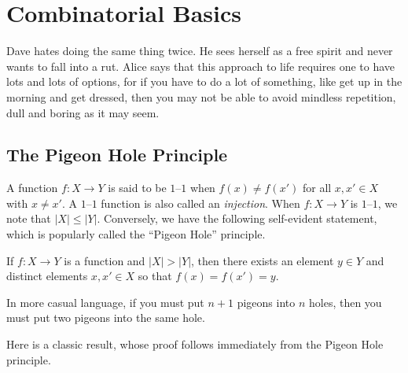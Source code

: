 
\chapter{Combinatorial Basics}\label{ch:basics}

Dave hates doing the same thing twice.  He sees herself
as a free spirit and never wants to fall into a rut.  Alice
says that this approach to life requires one to have lots
and lots of options, for if you have to do a lot of something,
like get up in the morning and get dressed, then you may not
be able to avoid mindless repetition, dull and boring as it
may seem.

\section{The Pigeon Hole Principle}\label{s:basics:pigeonhole}

A function $f:X\longrightarrow Y$ is said to be $1$--$1$ when
$f(x)\neq f(x')$ for all $x,x'\in X$ with $x\neq x'$.  A $1$--$1$
function is also called an \textit{injection}.  When
$f:X\longrightarrow Y$ is $1$--$1$, we note that $|X|\le |Y|$.
Conversely, we have the following self-evident statement, which is
popularly called the ``Pigeon Hole'' principle.

\begin{proposition}\label{prop:pigeon}
If $f:X\longrightarrow Y$ is a function and $|X|>|Y|$, then
there exists an element $y\in Y$ and distinct elements $x,x'\in X$
so that $f(x)=f(x')=y$.
\end{proposition}

In more casual language, if you must put $n+1$ pigeons into $n$ holes,
then you must put two pigeons into the same hole.

Here is a classic result, whose proof follows immediately from
the Pigeon Hole principle.

